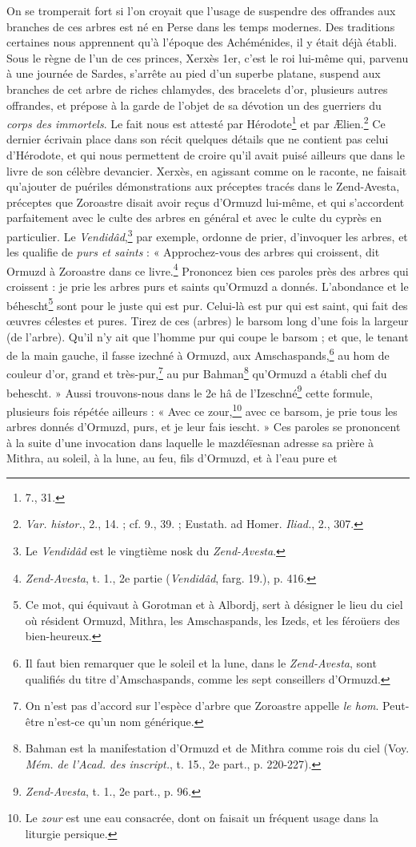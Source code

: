 \documentclass[a4paper, 11pt, oneside, polutonikogreek, french]{article}
\begin{document}
On se tromperait fort si l'on croyait que l'usage de suspendre des offrandes aux branches de ces arbres est né en Perse dans les temps modernes. Des traditions certaines nous apprennent qu'à l'époque des Achéménides, il y était déjà établi. Sous le règne de l'un de ces princes, Xerxès 1er, c'est le roi lui-même qui, parvenu à une journée de Sardes, s'arrête au pied d'un superbe platane, suspend aux branches de cet arbre de riches chlamydes, des bracelets d'or, plusieurs autres offrandes, et prépose à la garde de l'objet de sa dévotion un des guerriers du \emph{corps des immortels}. Le fait nous est attesté par Hérodote\footnote{7., 31.} et par Ælien.\footnote{\emph{Var. histor.}, 2., 14. ; cf. 9., 39. ; Eustath. ad Homer. \emph{Iliad.}, 2., 307.} Ce dernier écrivain place dans son récit quelques détails que ne contient pas celui d'Hérodote, et qui nous permettent de croire qu'il avait puisé ailleurs que dans le livre de son célèbre devancier. Xerxès, en agissant comme on le raconte, ne faisait qu'ajouter de puériles démonstrations aux préceptes tracés dans le Zend-Avesta, préceptes que Zoroastre disait avoir reçus d'Ormuzd lui-même, et qui s'accordent parfaitement avec le culte des arbres en général et avec le culte du cyprès en particulier. Le \emph{Vendidâd},\footnote{Le \emph{Vendidâd} est le vingtième nosk du \emph{Zend-Avesta}.} par exemple, ordonne de prier, d'invoquer les arbres, et les qualifie de \emph{purs et saints} : « Approchez-vous des arbres qui croissent, dit Ormuzd à Zoroastre dans ce livre.\footnote{\emph{Zend-Avesta}, t. 1., 2e partie (\emph{Vendidâd}, farg. 19.), p. 416.} Prononcez bien ces paroles près des arbres qui croissent : je prie les arbres purs et saints qu'Ormuzd a donnés. L'abondance et le béhescht\footnote{Ce mot, qui équivaut à Gorotman et à Albordj, sert à désigner le lieu du ciel où résident Ormuzd, Mithra, les Amschaspands, les Izeds, et les féroüers des bien-heureux.} sont pour le juste qui est pur. Celui-là est pur qui est saint, qui fait des œuvres célestes et pures. Tirez de ces (arbres) le barsom long d'une fois la largeur (de l'arbre). Qu'il n'y ait que l'homme pur qui coupe le barsom ; et que, le tenant de la main gauche, il fasse izechné à Ormuzd, aux Amschaspands,\footnote{Il faut bien remarquer que le soleil et la lune, dans le \emph{Zend-Avesta}, sont qualifiés du titre d'Amschaspands, comme les sept conseillers d'Ormuzd.} au hom de couleur d'or, grand et très-pur,\footnote{On n'est pas d'accord sur l'espèce d'arbre que Zoroastre appelle \emph{le hom}. Peut-être n'est-ce qu'un nom générique.} au pur Bahman\footnote{Bahman est la manifestation d'Ormuzd et de Mithra comme rois du ciel (Voy. \emph{Mém. de l'Acad. des inscript.}, t. 15., 2e part., p. 220-227).} qu'Ormuzd a établi chef du behescht. » Aussi trouvons-nous dans le 2e hâ de l'Izeschné\footnote{\emph{Zend-Avesta}, t. 1., 2e part., p. 96.} cette formule, plusieurs fois répétée ailleurs : « Avec ce zour,\footnote{Le \emph{zour} est une eau consacrée, dont on faisait un fréquent usage dans la liturgie persique.} avec ce barsom, je prie tous les arbres donnés d'Ormuzd, purs, et je leur fais iescht. » Ces paroles se prononcent à la suite d'une invocation dans laquelle le mazdéïesnan adresse sa prière à Mithra, au soleil, à la lune, au feu, fils d'Ormuzd, et à l'eau pure et 
\end{document}
